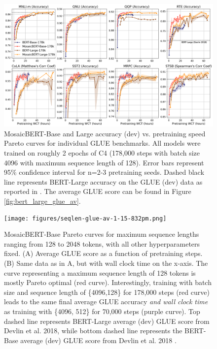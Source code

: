 \begin{figure}
    \centering
    \includegraphics[width=1\textwidth]{figures/bert-large-individual-glue-12-28-145pm.png}
    \caption{MosaicBERT-Base and Large accuracy (dev) vs. pretraining speed Pareto curves for individual GLUE benchmarks. All models were trained on roughly 2 epochs of C4 (178,000 steps with batch size 4096 with maximum sequence length of 128). Error bars represent 95\% confidence interval for n=2-3 pretraining seeds. Dashed black line represents BERT-Large accuracy on the GLUE (dev) data as reported in \cite{liu2019roberta}. The average GLUE score can be found in Figure \ref{fig:bert_large_glue_av}.}
    \label{fig:bert_large_glue_individual}
\end{figure}






\begin{figure}[h!]
    \centering
    \texttt{[image: figures/seqlen-glue-av-1-15-832pm.png]}
    \caption{MosaicBERT-Base Pareto curves for maximum sequence lengths ranging from 128 to 2048 tokens, with all other hyperparameters fixed. (A) Average GLUE score as a function of pretraining steps. (B) Same data as in A, but with wall clock time on the x-axis. The curve representing a maximum sequence length of 128 tokens is mostly Pareto optimal (red curve). Interestingly, training with batch size and sequence length of \{4096,128\} for 178,000 steps (red curve) leads to the same final average GLUE accuracy \textit{and wall clock time} as training with \{4096, 512\} for 70,000 steps (purple curve). Top dashed line represents BERT-Large average (dev) GLUE score from Devlin et al. 2018, while bottom dashed line represents the BERT-Base average (dev) GLUE score from Devlin et al. 2018 \cite{devlin2018bert}.}
    \label{fig:mosaicbert-base-seqlen}
\end{figure}









